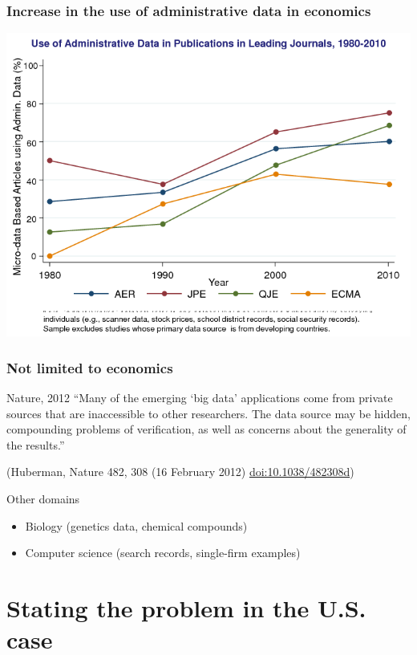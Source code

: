 \begin{frame}
\frametitle{Increase in the use of administrative data in economics}
%
\includegraphics[width=0.7\paperwidth]{ChettySlide2}
\end{frame}

\begin{frame}
\frametitle{Not limited to economics}
\begin{block}{Nature, 2012}
``Many of the emerging `big data' applications come from private sources that are inaccessible to other researchers. The data source may be hidden, compounding problems of verification, as well as concerns about the generality of the results.''\\
\end{block}
{\tiny (Huberman, Nature 482, 308 (16 February 2012) \href{http://dx.doi.org/10.1038/482308d}{doi:10.1038/482308d})}
\begin{block}{Other domains}
\begin{itemize}
\item Biology (genetics data, chemical compounds)
\item Computer science (search records, single-firm examples)
\end{itemize}
\end{block}
\end{frame}

\section[Problem]{Stating the problem in the U.S. case}
%

